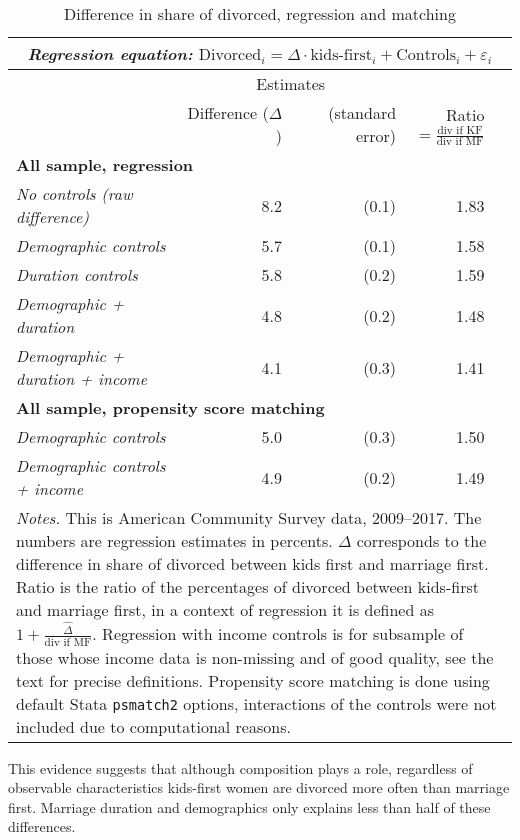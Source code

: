 \documentclass[12pt,letter]{article}
\begin{document}
\begin{table}[h]
\caption{Difference in share of divorced, regression and matching\label{share_table_1}}
\begin{tabular}{l r r r r}
\multicolumn{5}{c}{\textit{Regression equation:} $\text{Divorced}_i = \Delta \cdot \text{kids-first}_i + \text{Controls}_i + \varepsilon_i$} \\\hline
\hline
& \multicolumn{2}{c}{Estimates} &  & \\
&  Difference ($\Delta$)  & (standard error) & Ratio $= \frac{\text{div if KF}}{\text{div if MF}}$ &  \\\hline
\multicolumn{5}{l}{\textbf{All sample, regression}} \\\hline
\textit{No controls (raw difference) }& 8.2 & (0.1) & 1.83 \\
\textit{Demographic controls }& 5.7 & (0.1) & 1.58 \\
\textit{Duration controls} &  5.8 & (0.2) & 1.59 \\
\textit{Demographic + duration} &  4.8 & (0.2) & 1.48 \\
\textit{Demographic + duration + income} & 4.1 & (0.3) & 1.41 \\\hline
\multicolumn{5}{l}{\textbf{All sample, propensity score matching}} \\\hline
\textit{Demographic controls} & 5.0 & (0.3) & 1.50 \\
\textit{Demographic controls + income} & 4.9 & (0.2) & 1.49 \\\hline
\multicolumn{5}{p{\linewidth}}{\footnotesize \textit{Notes.} This is American Community Survey data, 2009--2017. The numbers are regression estimates in percents.  $\Delta$ corresponds to the difference in share of divorced between kids first and marriage first. Ratio is the ratio of the percentages of divorced between kids-first and marriage first, in a context of regression it is defined as $1 + \frac{\hat{\Delta}}{\text{div if MF}}$. Regression with income controls is for subsample of those whose income data is non-missing and of good quality, see the text for precise definitions. Propensity score matching is done using default Stata \texttt{psmatch2} options, interactions of the controls were not included due to computational reasons.}\\\hline\hline
\end{tabular}
\end{table}

This evidence suggests that although composition plays a role, regardless of observable characteristics kids-first women are divorced more often than marriage first. Marriage duration and demographics only explains less than half of these differences. 
\end{document}
